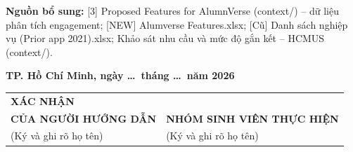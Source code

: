 \documentclass[12pt,a4paper]{article}
\begin{document}
\textbf{Nguồn bổ sung:} 
[3] Proposed Features for AlumnVerse (context/) -- dữ liệu phân tích engagement;  
[NEW] Alumverse Features.xlsx;  
[Cũ] Danh sách nghiệp vụ (Prior app 2021).xlsx;  
Khảo sát nhu cầu và mức độ gắn kết -- HCMUS (context/).

\vspace{2cm}

\hfill\textbf{TP. Hồ Chí Minh, ngày \ldots\ tháng \ldots\ năm 2026}

\begin{center}
\begin{tabular}{>{\centering\arraybackslash}p{}
                >{\centering\arraybackslash}p{}}


\textbf{XÁC NHẬN}\\\textbf{CỦA NGƯỜI HƯỚNG DẪN}
&
\textbf{NHÓM SINH VIÊN THỰC HIỆN}
\\[0cm]

(Ký và ghi rõ họ tên)
&
(Ký và ghi rõ họ tên)
\\[2.5cm]

\end{tabular}
\end{center}
\end{document}
